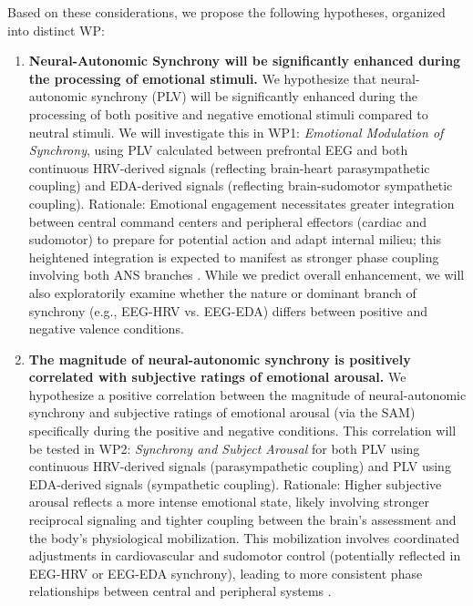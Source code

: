 \documentclass[12pt]{article} %
\begin{document}
Based on these considerations, we propose the following hypotheses, organized into distinct \gls{WP}:

\begin{enumerate}[label=(\alph*)] %
    \item \textbf{Neural-Autonomic Synchrony will be significantly enhanced during the processing of emotional stimuli.} We hypothesize that neural-autonomic synchrony (\gls{PLV}) will be significantly enhanced during the processing of both positive and negative emotional stimuli compared to neutral stimuli. We will investigate this in \gls{WP}1: \emph{Emotional Modulation of Synchrony}, using \gls{PLV} calculated between prefrontal \gls{EEG} and both continuous \gls{HRV}-derived signals (reflecting brain-heart parasympathetic coupling) and \gls{EDA}-derived signals (reflecting brain-sudomotor sympathetic coupling). Rationale: Emotional engagement necessitates greater integration between central command centers and peripheral effectors (cardiac and sudomotor) to prepare for potential action and adapt internal milieu; this heightened integration is expected to manifest as stronger phase coupling involving both \gls{ANS} branches \parencite{critchleyNeuralMechanismsAutonomic2005}. While we predict overall enhancement, we will also exploratorily examine whether the nature or dominant branch of synchrony (e.g., \gls{EEG}-\gls{HRV} vs. \gls{EEG}-\gls{EDA}) differs between positive and negative valence conditions.
    \item \textbf{The magnitude of neural-autonomic synchrony is positively correlated with subjective ratings of emotional arousal.} We hypothesize a positive correlation between the magnitude of neural-autonomic synchrony and subjective ratings of emotional arousal (via the \gls{SAM}) specifically during the positive and negative conditions. This correlation will be tested in \gls{WP}2: \emph{Synchrony and Subject Arousal} for both \gls{PLV} using continuous \gls{HRV}-derived signals (parasympathetic coupling) and \gls{PLV} using \gls{EDA}-derived signals (sympathetic coupling). Rationale: Higher subjective arousal reflects a more intense emotional state, likely involving stronger reciprocal signaling and tighter coupling between the brain's assessment and the body's physiological mobilization. This mobilization involves coordinated adjustments in cardiovascular and sudomotor control (potentially reflected in \gls{EEG}-\gls{HRV} or \gls{EEG}-\gls{EDA} synchrony), leading to more consistent phase relationships between central and peripheral systems \parencite{valenzaRevealingRealTimeEmotional2014, boucseinElectrodermalActivity2012}.

\end{enumerate}
\end{document}
